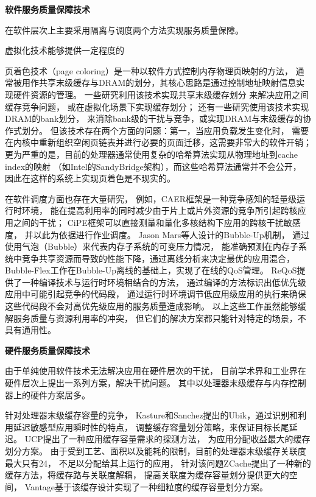 \textbf{软件服务质量保障技术}\quad

在软件层次上主要采用隔离与调度两个方法实现服务质量保障。

虚拟化技术能够提供一定程度的



页着色技术（page coloring）是一种以软件方式控制内存物理页映射的方法，
通常被用作共享末级缓存与DRAM的划分，其核心思路是通过控制地址映射信息实现硬件资源的管理。
一些研究利用该技术实现共享末级缓存划分\cite{lin_gaining_2008, tam_managing_2007}
来解决应用之间缓存竞争问题，
或在虚拟化场景下实现缓存划分\cite{Jin2009, Chen2010, Wang2012}；
还有一些研究\cite{liu_software_2012}使用该技术实现DRAM的bank划分，
来消除bank级的干扰与竞争，或实现DRAM与末级缓存的协作式划分\cite{Liu:2014:ISCA}。
但该技术存在两个方面的问题：第一，当应用负载发生变化时，
需要在内核中重新组织空闲页链表并进行必要的页面迁移，这需要非常大的软件开销；
更为严重的是，目前的处理器通常使用复杂的哈希算法实现从物理地址到cache index的映射
（如Intel的SandyBridge架构），而这些哈希算法通常并不会公开，
因此在这样的系统上实现页着色是不现实的。

在软件调度方面也存在大量研究，
例如，CAER框架\cite{mars_contention_2010}是一种竞争感知的轻量级运行时环境，
能在提高利用率的同时减少由于片上或片外资源的竞争所引起跨核应用之间的干扰；
CiPE框架\cite{mars_directly_2011}可以直接测量和量化多核结构下应用的跨核干扰敏感度，
并以此为依据进行作业调度。
Jason Mars等人设计的Bubble-Up\cite{mars_bubble-up:_2011}机制，
通过使用气泡（Bubble）来代表内存子系统的可变压力情况，
能准确预测在内存子系统中竞争共享资源而导致的性能下降，通过离线分析来决定最优的应用混合，
Bubble-Flex\cite{yang_bubble-flux:_2013}工作在Bubble-Up离线的基础上，实现了在线的QoS管理。
ReQoS\cite{tang_reqos:_2013}提供了一种编译技术与运行时环境相结合的方法，
通过编译的方法标识出低优先级应用中可能引起竞争的代码段，
通过运行时环境调节低应用级应用的执行来确保这些代码段不会对高优先级应用的服务质量造成影响。
以上这些工作虽然能够缓解服务质量与资源利用率的冲突，
但它们的解决方案都只能针对特定的场景，不具有通用性。


\textbf{硬件服务质量保障技术}\quad

由于单纯使用软件技术无法解决应用在硬件层次的干扰，
目前学术界和工业界在硬件层次上提出一系列方案，解决干扰问题。
其中以处理器末级缓存与内存控制器上的硬件方案居多。

针对处理器末级缓存容量的竞争，
Kasture和Sanchez提出的Ubik\cite{kasture_ubik:_2014}，通过识别和利用延迟敏感型应用瞬时性的特点，
调整缓存容量划分策略，来保证目标长尾延迟。
UCP\cite{qureshi_utility-based_2006}提出了一种应用缓存容量需求的探测方法，
为应用分配收益最大的缓存划分方案。
由于受到工艺、面积以及能耗的限制，目前的处理器末级缓存关联度最大只有24，
不足以分配给其上运行的应用，
针对该问题ZCache\cite{sanchez_zcache:_2010}提出了一种新的缓存方法，将缓存路与关联度解耦，
提高关联度为缓存容量划分提供更大的空间，
Vantage\cite{sanchez_vantage:_2011}基于该缓存设计实现了一种细粒度的缓存容量划分方案。

